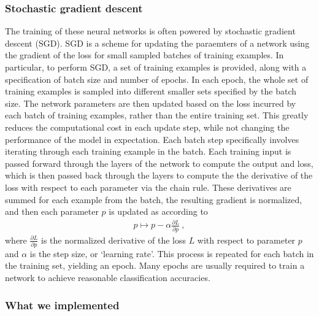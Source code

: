 \subsubsection{Stochastic gradient descent}
The training of these neural networks is often powered by stochastic gradient descent (SGD).
SGD is a scheme for updating the paraemters of a network using the gradient of the loss for small sampled batches of training examples.
In particular, to perform SGD, a set of training examples is provided, along with a specification of batch size and number of epochs.
In each epoch, the whole set of training examples is sampled into different smaller sets specified by the batch size.
The network parameters are then updated based on the loss incurred by each batch of training examples, rather than the entire training set.
This greatly reduces the computational cost in each update step, while not changing the performance of the model in expectation.
Each batch step specifically involves iterating through each training example in the batch.
Each training input is passed forward through the layers of the network to compute the output and loss, which is then passed back through the layers to compute the the derivative of the loss with respect to each parameter via the chain rule.
These derivatives are summed for each example from the batch, the resulting gradient is normalized, and then each parameter $p$ is updated as according to
\begin{equation*}
  \begin{aligned}
    p \mapsto p - \alpha\frac{\partial L}{\partial p} ~,
  \end{aligned}
\end{equation*}
where $\frac{\partial L}{\partial p}$ is the normalized derivative of the loss $L$ with respect to parameter $p$ and $\alpha$ is the step size, or `learning rate'.
This process is repeated for each batch in the training set, yielding an epoch.
Many epochs are usually required to train a network to achieve reasonable classification accuracies.

\subsubsection{What we implemented}

